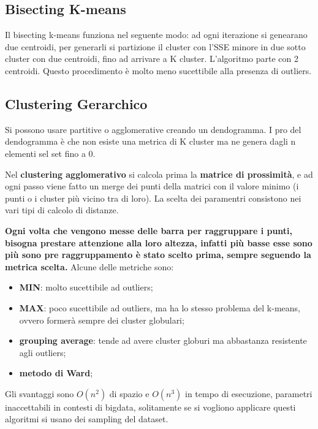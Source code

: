 \documentclass[12pt]{article}
\begin{document}
\subsection{Bisecting K-means}
Il bisecting k-means funziona nel seguente modo: ad ogni iterazione si genearano due centroidi, per generarli si partizione il cluster con l'SSE minore in due sotto cluster con due centroidi, fino ad arrivare a K cluster. L'algoritmo parte con 2 centroidi. Questo procedimento \`e molto meno sucettibile alla presenza di outliers.


\subsection{Clustering Gerarchico}
Si possono usare partitive o agglomerative creando un dendogramma. I pro del dendogramma \`e che non esiste una metrica di K cluster ma ne genera dagli n elementi sel set fino a 0.

Nel \textbf{clustering agglomerativo } si calcola prima la \textbf{matrice di prossimit\`a}, e ad ogni passo viene fatto un merge dei punti della matrici con il valore minimo (i punti o i cluster pi\`u vicino tra di loro). La scelta dei paramentri consistono nei vari tipi di calcolo di distanze.

\textbf{Ogni volta che vengono messe delle barra per raggruppare i punti, bisogna prestare attenzione alla loro altezza, infatti pi\`u basse esse sono pi\`u sono pre raggruppamento \`e stato scelto prima, sempre seguendo la metrica scelta.}
Alcune delle metriche sono:
\begin{itemize}
    \item \textbf{MIN}: molto sucettibile ad outliers;
    \item \textbf{MAX}: poco sucettibile ad outliers, ma ha lo stesso problema del k-means, ovvero former\`a sempre dei cluster globulari;
    \item \textbf{grouping average}: tende ad avere cluster globuri ma abbastanza resistente agli outliers;
    \item \textbf{metodo di Ward};
\end{itemize}
Gli svantaggi sono $O(n^{2})$ di spazio e $O(n^{3})$ in tempo di esecuzione, parametri inaccettabili in contesti di bigdata, solitamente se si vogliono applicare questi algoritmi si usano dei sampling del dataset.
\end{document}
